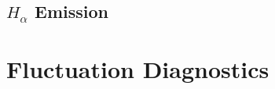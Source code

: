 \noindent {}

\subsection{$H_\alpha$ Emission}\label{subsec:app_halpha}

\nicesectionending

\section{Fluctuation Diagnostics}\label{sec:app_fluct}

\nicechapterending


